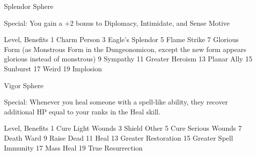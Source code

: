 Splendor Sphere

Special: You gain a +2 bonus to Diplomacy, Intimidate, and Sense Motive

Level, Benefits
1 Charm Person
3 Eagle's Splendor
5 Flame Strike
7 Glorious Form (as Monstrous Form in the Dungeonomicon, except the new form appears glorious instead of monstrous)
9 Sympathy
11 Greater Heroism
13 Planar Ally
15 Sunburst
17 Weird
19 Implosion


Vigor Sphere

Special: Whenever you heal someone with a spell-like ability, they recover additional HP equal to your ranks in the Heal skill.

Level, Benefits
1 Cure Light Wounds
3 Shield Other
5 Cure Serious Wounds
7 Death Ward
9 Raise Dead
11 Heal
13 Greater Restoration
15 Greater Spell Immunity
17 Mass Heal
19 True Resurrection 